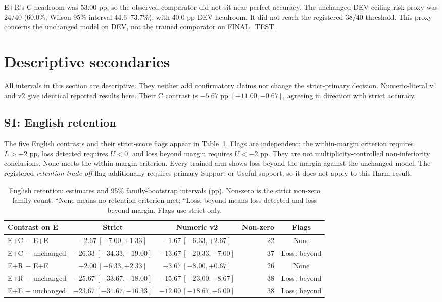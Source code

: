 E+R's C headroom was 53.00 pp, so the observed comparator did not sit near perfect accuracy. The unchanged-DEV ceiling-risk proxy was $24/40$ (60.0\%; Wilson 95\% interval 44.6--73.7\%), with 40.0 pp DEV headroom. It did not reach the registered $38/40$ threshold. This proxy concerns the unchanged model on DEV, not the trained comparator on FINAL\_TEST.

\section{Descriptive secondaries}
\label{sec:phase2-secondaries}
All intervals in this section are descriptive. They neither add confirmatory claims nor change the strict-primary decision. Numeric-literal v1 and v2 give identical reported results here. Their C contrast is $-5.67$ pp $[-11.00,-0.67]$, agreeing in direction with strict accuracy.

\subsection{S1: English retention}
The five English contrasts and their strict-score flags appear in Table~\ref{tab:phase2-retention}. Flags are independent: the within-margin criterion requires $L>-2$ pp, loss detected requires $U<0$, and loss beyond margin requires $U<-2$ pp. They are not multiplicity-controlled non-inferiority conclusions. None meets the within-margin criterion. Every trained arm shows loss beyond the margin against the unchanged model. The registered \emph{retention trade-off} flag additionally requires primary Support or Useful support, so it does not apply to this Harm result.

\begin{table}[H]
\centering\scriptsize\singlespacing
\caption{English retention: estimates and 95\% family-bootstrap intervals (pp). Non-zero is the strict non-zero family count. ``None means no retention criterion met; ``Loss; beyond means loss detected and loss beyond margin. Flags use strict only.}
\label{tab:phase2-retention}
\begin{tabular}{@{}lccrc@{}}
\toprule
Contrast on E & Strict & Numeric v2 & Non-zero & Flags\\
\midrule
E+C $-$ E+E & $-2.67\ [-7.00,+1.33]$ & $-1.67\ [-6.33,+2.67]$ & 22 & None\\
E+C $-$ unchanged & $-26.33\ [-34.33,-19.00]$ & $-13.67\ [-20.33,-7.00]$ & 37 & Loss; beyond\\
E+R $-$ E+E & $-2.00\ [-6.33,+2.33]$ & $-3.67\ [-8.00,+0.67]$ & 26 & None\\
E+R $-$ unchanged & $-25.67\ [-33.67,-18.00]$ & $-15.67\ [-23.00,-8.67]$ & 38 & Loss; beyond\\
E+E $-$ unchanged & $-23.67\ [-31.67,-16.33]$ & $-12.00\ [-18.67,-6.00]$ & 38 & Loss; beyond\\
\bottomrule
\end{tabular}
\end{table}


